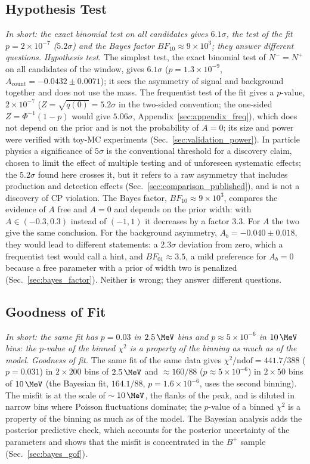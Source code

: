 \subsection{Hypothesis Test}
\emph{In short: the exact binomial test on all candidates gives $6.1\sigma$, the test of the fit $p=2\times10^{-7}$ ($5.2\sigma$) and the Bayes factor $BF_{10}\approx9\times10^3$; they answer different questions.}
\emph{Hypothesis test.} The simplest test, the exact binomial test of $N^-=N^+$ on all candidates of the window, gives $6.1\sigma$ ($p=1.3\times10^{-9}$, $A_{\mathrm{count}}=-0.0432\pm0.0071$); it sees the asymmetry of signal and background together and does not use the mass. The frequentist test of the fit gives a $p$-value, $2\times10^{-7}$ ($Z=\sqrt{q(0)}=5.2\sigma$ in the two-sided convention; the one-sided $Z=\Phi^{-1}(1-p)$ would give $5.06\sigma$, Appendix~\ref{sec:appendix_freq}), which does not depend on the prior and is not the probability of $A=0$; its size and power were verified with toy-MC experiments (Sec.~\ref{sec:validation_power}). In particle physics a significance of $5\sigma$ is the conventional threshold for a discovery claim, chosen to limit the effect of multiple testing and of unforeseen systematic effects; the $5.2\sigma$ found here crosses it, but it refers to a raw asymmetry that includes production and detection effects (Sec.~\ref{sec:comparison_published}), and is not a discovery of CP violation. The Bayes factor, $BF_{10}\approx9\times10^3$, compares the evidence of $A$ free and $A=0$ and depends on the prior width: with $A\in(-0.3,0.3)$ instead of $(-1,1)$ it decreases by a factor $3.3$. For $A$ the two give the same conclusion. For the background asymmetry, $A_b=-0.040\pm0.018$, they would lead to different statements: a $2.3\sigma$ deviation from zero, which a frequentist test would call a hint, and $BF_{01}\approx3.5$, a mild preference for $A_b=0$ because a free parameter with a prior of width two is penalized (Sec.~\ref{sec:bayes_factor}). Neither is wrong; they answer different questions.

\subsection{Goodness of Fit}
\emph{In short: the same fit has $p=0.03$ in $2.5\,\MeV$ bins and $p\approx5\times10^{-6}$ in $10\,\MeV$ bins: the $p$-value of the binned $\chi^2$ is a property of the binning as much as of the model.}
\emph{Goodness of fit.} The same fit of the same data gives $\chi^2/\mathrm{ndof}=441.7/388$ ($p=0.031$) in $2\times200$ bins of $2.5\,\MeV$ and $\approx160/88$ ($p\approx5\times10^{-6}$) in $2\times50$ bins of $10\,\MeV$ (the Bayesian fit, $164.1/88$, $p=1.6\times10^{-6}$, uses the second binning). The misfit is at the scale of $\sim10\,\MeV$, the flanks of the peak, and is diluted in narrow bins where Poisson fluctuations dominate; the $p$-value of a binned $\chi^2$ is a property of the binning as much as of the model. The Bayesian analysis adds the posterior predictive check, which accounts for the posterior uncertainty of the parameters and shows that the misfit is concentrated in the $B^+$ sample (Sec.~\ref{sec:bayes_gof}).

